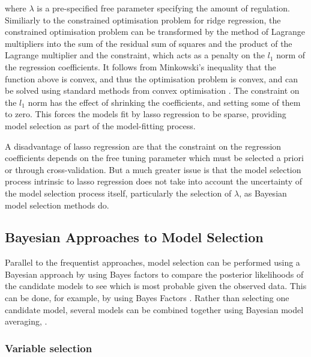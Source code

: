 where $\lambda$ is a pre-specified free parameter specifying the amount of
regulation. Similiarly to the constrained optimisation problem for ridge
regression, the constrained optimisation problem can be transformed by the
method of Lagrange multipliers into the sum of the residual sum of squares and
the product of the Lagrange multiplier and the constraint, which acts as a
penalty on the $l_1$ norm of the regression coefficients. It follows from
Minkowski's inequality that the function above is convex, and thus the
optimisation problem is convex, and can be solved using standard methods from
convex optimisation \citep{Boyd2010}.  The constraint on the $l_1$ norm has the
effect of shrinking the coefficients, and setting some of them to zero. This
forces the models fit by lasso regression to be sparse, providing model
selection as part of the model-fitting process.

A disadvantage of lasso regression are that the constraint on the regression
coefficients depends on the free tuning parameter which must be selected a
priori or through cross-validation. But a much greater issue is that the model
selection process intrinsic to lasso regression does not take into account the
uncertainty of the model selection process itself, particularly the selection of
$\lambda$, as Bayesian model selection methods do.

\subsection{Bayesian Approaches to Model Selection}

Parallel to the frequentist approaches, model selection can be performed using
a Bayesian approach by using Bayes factors to compare the posterior likelihoods
of the candidate models to see which is most probable given the observed data.
This can be done, for example, by using Bayes Factors \citep{Kass1993}. Rather
than selecting one candidate model, several models can be combined together
using Bayesian model  averaging, \citep{Hoeting1999, Raftery1997,
Fernandez2001, Papaspiliopoulos2016}.

\subsubsection{Variable selection}

